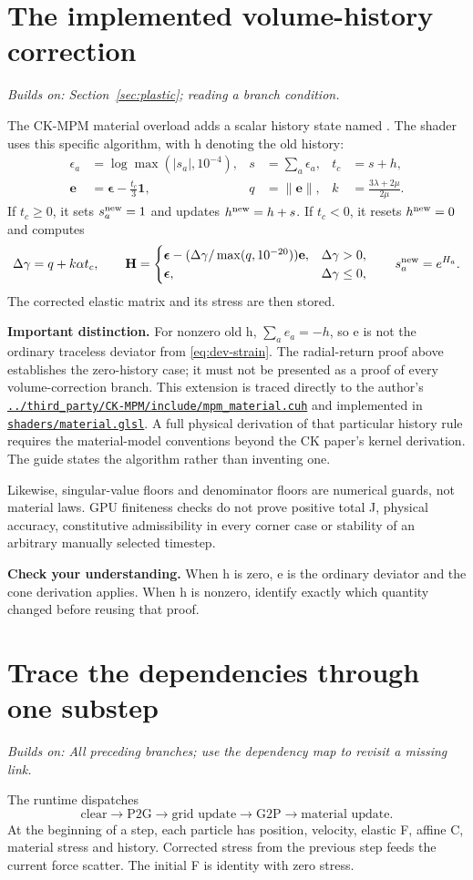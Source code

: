 \documentclass[11pt,a4paper]{article}
\newcommand{\mat}[1]{\mathbf{#1}}
\newcommand{\code}[1]{\texttt{\detokenize{#1}}}
\newcommand{\src}[1]{\href{../../#1}{\nolinkurl{#1}}}
\newcommand{\prereq}[1]{\textit{Builds on: #1}\par}
\newcommand{\checkpoint}[1]{\par\textbf{Check your understanding.} #1\par}
\numberwithin{equation}{section}
\begin{document}
\section{The implemented volume-history correction}\label{sec:history}
\prereq{Section~\ref{sec:plastic}; reading a branch condition.}
The CK-MPM material overload adds a scalar history state named \code{logJp}.
The shader uses this specific algorithm, with h denoting the old history:
\begin{align*}
\epsilon_a&=\log\max(|s_a|,10^{-4}),&
s&=\sum_a\epsilon_a,& t_c&=s+h,\\
\mat e&=\boldsymbol\epsilon-\tfrac{t_c}3\mat1,&
q&=\|\mat e\|,& k&=\frac{3\lambda+2\mu}{2\mu}.
\end{align*}
If $t_c\ge0$, it sets $s_a^{\rm new}=1$ and updates $h^{\rm new}=h+s$.
If $t_c<0$, it resets $h^{\rm new}=0$ and computes
\[
\Delta\gamma=q+k\alpha t_c,\qquad
\mat H=\begin{cases}
\boldsymbol\epsilon-(\Delta\gamma/\max(q,10^{-20}))\mat e,&\Delta\gamma>0,\\
\boldsymbol\epsilon,&\Delta\gamma\le0,
\end{cases}
\qquad s_a^{\rm new}=e^{H_a}.
\]
The corrected elastic matrix and its stress are then stored.

\textbf{Important distinction.} For nonzero old h,
$\sum_a e_a=-h$, so e is not the ordinary traceless deviator from
\eqref{eq:dev-strain}. The radial-return proof above establishes the zero-history
case; it must not be presented as a proof of every volume-correction branch.
This extension is traced directly to the author's
\src{../third_party/CK-MPM/include/mpm_material.cuh} and implemented in
\src{shaders/material.glsl}. A full physical derivation of that particular
history rule requires the material-model conventions beyond the CK paper's
kernel derivation. The guide states the algorithm rather than inventing one.

Likewise, singular-value floors and denominator floors are numerical guards,
not material laws. GPU finiteness checks do not prove positive total J,
physical accuracy, constitutive admissibility in every corner case or stability
of an arbitrary manually selected timestep.
\checkpoint{When h is zero, e is the ordinary deviator and the cone derivation
applies. When h is nonzero, identify exactly which quantity changed before
reusing that proof.}

\section{Trace the dependencies through one substep}\label{sec:trace}
\prereq{All preceding branches; use the dependency map to revisit a missing link.}
The runtime dispatches
\[
\text{clear}\to\text{P2G}\to\text{grid update}\to\text{G2P}\to\text{material update}.
\]
At the beginning of a step, each particle has position, velocity, elastic F,
affine C, material stress and history. Corrected stress from the previous step
feeds the current force scatter. The initial F is identity with zero stress.
\end{document}
